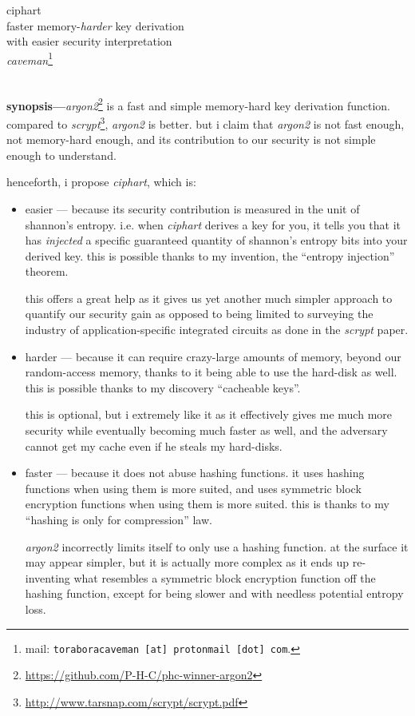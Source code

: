 \documentclass[twocolumn]{article}
\begin{document}
\SetInd{.15em}{1em}

\begin{center}
\Huge
ciphart\\
\Large
faster memory-\emph{harder} key derivation \\
with easier security interpretation\\
\normalsize
\emph{caveman}\footnote{mail: \texttt{toraboracaveman [at] protonmail [dot]
com}.}\\
\footnotesize
\DTMnow\\
\end{center}

\noindent\textbf{synopsis---}\emph{argon2}\footnote{\url{https://github.com/P-H-C/phc-winner-argon2}}
is a fast and simple memory-hard key derivation function.  compared to
\emph{scrypt}\footnote{\url{http://www.tarsnap.com/scrypt/scrypt.pdf}},
\emph{argon2} is better.  but i claim that \emph{argon2} is not fast
enough, not memory-hard enough, and its contribution to our security is not
simple enough to understand.

henceforth, i propose \emph{ciphart}, which is:
\begin{itemize}
    \item easier --- because its security contribution is measured in the
    unit of shannon's entropy.  i.e. when \emph{ciphart} derives a key for
    you, it tells you that it has \emph{injected} a specific guaranteed
    quantity of shannon's entropy bits into your derived key.  this is
    possible thanks to my invention, the ``entropy injection'' theorem.

    this offers a great help as it gives us yet another much simpler
    approach to quantify our security gain as opposed to being limited to
    surveying the industry of application-specific integrated circuits as
    done in the \emph{scrypt} paper.

    \item harder --- because it can require crazy-large amounts of memory,
    beyond our random-access memory, thanks to it being able to use the
    hard-disk as well.  this is possible thanks to my discovery ``cacheable
    keys''.

    this is optional, but i extremely like it as it effectively gives me
    much more security while eventually becoming much faster as well, and
    the adversary cannot get my cache even if he steals my hard-disks.

    \item faster --- because it does not abuse hashing functions.  it uses
    hashing functions when using them is more suited, and uses symmetric
    block encryption functions when using them is  more suited.  this is
    thanks to my ``hashing is only for compression'' law.

    \emph{argon2} incorrectly limits itself to only use a hashing function.
    at the surface it may appear simpler, but it is actually more complex
    as it ends up re-inventing what resembles a symmetric block encryption
    function off the hashing function, except for being slower and with
    needless potential entropy loss.
\end{itemize}
\end{document}
